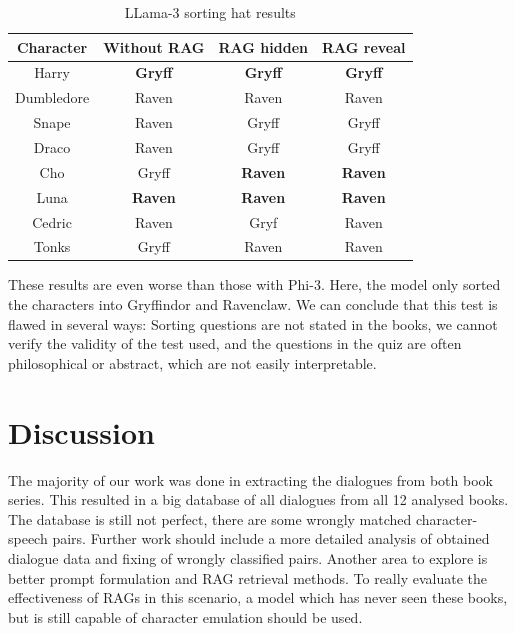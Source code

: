 \documentclass[fleqn,moreauthors,10pt]{ds_report}
\begin{document}
\begin{table}[hbt]
	\caption{LLama-3 sorting hat results}
	\centering
	\begin{tabular}{c | c | c | c }
		Character  & Without RAG    & RAG hidden     & RAG reveal     \\ \hline
		Harry      & \textbf{Gryff} & \textbf{Gryff} & \textbf{Gryff} \\
		Dumbledore & Raven          & Raven          & Raven          \\ \hline
		Snape      & Raven          & Gryff          & Gryff          \\
		Draco      & Raven          & Gryff          & Gryff          \\ \hline
		Cho        & Gryff          & \textbf{Raven} & \textbf{Raven} \\
		Luna       & \textbf{Raven} & \textbf{Raven} & \textbf{Raven} \\ \hline
		Cedric     & Raven          & Gryf           & Raven          \\
		Tonks      & Gryff          & Raven          & Raven          \\
	\end{tabular}
	\label{tab:sorting_hat_results_llama}
\end{table}

These results are even worse than those with Phi-3.
Here, the model only sorted the characters into Gryffindor and Ravenclaw.
We can conclude that this test is flawed in several ways:
Sorting questions are not stated in the books,
we cannot verify the validity of the test used,
and the questions in the quiz are often philosophical or abstract, which are not easily interpretable.


\section*{Discussion}

The majority of our work was done in extracting the dialogues from both book series.
This resulted in a big database of all dialogues from all 12 analysed books.
The database is still not perfect, there are some wrongly matched character-speech pairs.
Further work should include a more detailed analysis of obtained dialogue data and fixing of wrongly classified pairs.
Another area to explore is better prompt formulation and RAG retrieval methods.
To really evaluate the effectiveness of RAGs in this scenario, a model which has never seen these books,
but is still capable of character emulation should be used.



\end{document}
